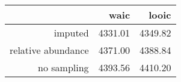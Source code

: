 \begin{table}[ht]
\centering
\begin{tabular}{rrr}
  \hline
 & waic & looic \\ 
  \hline
imputed & 4331.01 & 4349.82 \\ 
  relative abundance & 4371.00 & 4388.84 \\ 
  no sampling & 4393.56 & 4410.20 \\ 
   \hline
\end{tabular}
\label{tab:comparison}
\end{table}
